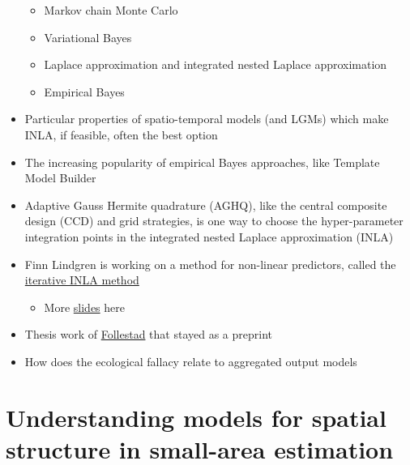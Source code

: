 \documentclass[a4paper, nobind]{templates/ociamthesis}
\providecommand{\tightlist}{%
  \setlength{\itemsep}{0pt}\setlength{\parskip}{0pt}}
\begin{document}
\begin{itemize}
  \begin{itemize}
  \tightlist
  \item
    Markov chain Monte Carlo
  \item
    Variational Bayes
  \item
    Laplace approximation and integrated nested Laplace approximation
  \item
    Empirical Bayes
  \end{itemize}
\item
  Particular properties of spatio-temporal models (and LGMs) which make INLA, if feasible, often the best option
\item
  The increasing popularity of empirical Bayes approaches, like Template Model Builder \autocite{osgoodzimmerman2021statistical}
\item
  Adaptive Gauss Hermite quadrature (AGHQ), like the central composite design (CCD) and grid strategies, is one way to choose the hyper-parameter integration points in the integrated nested Laplace approximation (INLA)
\item
  Finn Lindgren is working on a method for non-linear predictors, called the \href{https://github.com/inlabru-org/inlabru/blob/55896f10d563c14e34cab577b29b733aac051f86/vignettes/method.Rmd}{iterative INLA method}

  \begin{itemize}
  \tightlist
  \item
    More \href{https://informatique-mia.inrae.fr/reseau-resste/sites/default/files/2020-09/slides-Lindgren_Avignon2018.pdf}{slides} here
  \end{itemize}
\item
  Thesis work of \href{https://cds.cern.ch/record/639625/files/sis-2003-305.pdf}{Follestad} that stayed as a preprint
\item
  How does the ecological fallacy relate to aggregated output models
\end{itemize}

\hypertarget{understanding-models-for-spatial-structure-in-small-area-estimation}{%
\chapter*{Understanding models for spatial structure in small-area estimation}\label{understanding-models-for-spatial-structure-in-small-area-estimation}}

\adjustmtc
{}
\end{document}
